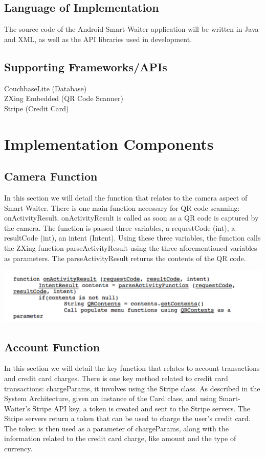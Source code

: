 \documentclass[12pt, titlepage]{article}
\begin{document}
\subsection{Language of Implementation}
The source code of the Android Smart-Waiter application will be written in Java and XML, as well as the API libraries used in development. 

\subsection{Supporting Frameworks/APIs}
CouchbaseLite (Database)\\
ZXing Embedded (QR Code Scanner)\\
Stripe (Credit Card)

\section{Implementation Components}
\subsection{Camera Function}
In this section we will detail the function that relates to the camera aspect of Smart-Waiter. There is one main function necessary for QR code scanning: onActivityResult. onActivityResult is called as soon as a QR code is captured by the camera. The function is passed three variables, a requestCode (int), a resultCode (int), an intent (Intent). Using these three variables, the function calls the ZXing function parseActivityResult using the three aforementioned variables as parameters. The parseActivityResult returns the contents of the QR code. 
 
\includegraphics[width=150mm,scale=0.5]{camera.png}

\subsection{Account Function}
In this section we will detail the key function that relates to account transactions and credit card charges. There is one key method related to credit card transactions: chargeParams, it involves using the Stripe class. As described in the System Architecture, given an instance of the Card class, and using Smart-Waiter's Stripe API key, a token is created and sent to the Stripe servers. The Stripe servers return a token that can be used to charge the user's credit card. The token is then used as a parameter of chargeParams, along with the information related to the credit card charge, like amount and the type of currency. 
\end{document}
